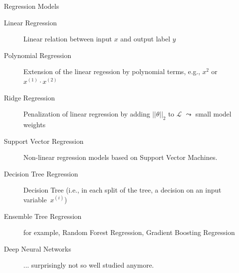 \documentclass[aspectratio=169]{../latex_main/tntbeamer}  %
\begin{document}
    \begin{frame}[c]{Regression Models}
        \begin{description}
            \item[Linear Regression] Linear relation between input $x$ and output label $y$
            \pause
            \item[Polynomial Regression] Extension of the linear regession by polynomial terms, e.g., $x^2$ or $x^{(1)} \cdot x^{(2)}$
            \pause
            \item[Ridge Regression] Penalization of linear regression by adding $||\theta||_2$ to $\mathcal{L}$ $\leadsto$ small model weights
            \pause
            \item[Support Vector Regression] Non-linear regression models based on Support Vector Machines.
            \pause
            \item[Decision Tree Regression] Decision Tree (i.e., in each split of the tree, a decision on an input variable~$x^{(i)}$)
            \pause
            \item[Ensemble Tree Regression] for example, Random Forest Regression, Gradient Boosting Regression
            \pause
            \item[Deep Neural Networks] ... surprisingly not so well studied anymore.
        \end{description}
    
        
    \end{frame}
\end{document}
